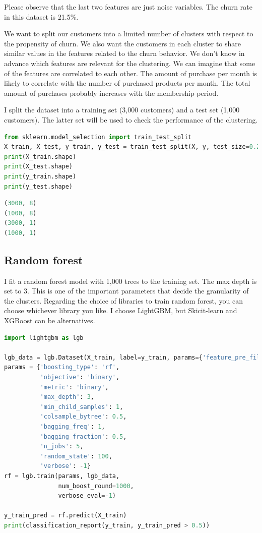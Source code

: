 \documentclass{article}
\begin{document}
Please observe that the last two features are just noise variables. The churn rate in this dataset is 21.5\%.

We want to split our customers into a limited number of clusters with respect to the propensity of churn. We also want the customers in each cluster to share similar values in the features related to the churn behavior. We don't know in advance which features are relevant for the clustering. We can imagine that some of the features are correlated to each other. The amount of purchase per month is likely to correlate with the number of purchased products per month. The total amount of purchases probably increases with the membership period.

I split the dataset into a training set (3,000 customers) and a test set (1,000 customers). The latter set will be used to check the performance of the clustering.

\begin{lstlisting}[language=Python]
from sklearn.model_selection import train_test_split
X_train, X_test, y_train, y_test = train_test_split(X, y, test_size=0.25, random_state=12)
print(X_train.shape)
print(X_test.shape)
print(y_train.shape)
print(y_test.shape)
\end{lstlisting}

\begin{lstlisting}[language=Python,numbers=none]
(3000, 8)
(1000, 8)
(3000, 1)
(1000, 1)
\end{lstlisting}

\subsection{Random forest}
I fit a random forest model with 1,000 trees to the training set. The max depth is set to 3. This is one of the important parameters that decide the granularity of the clusters. Regarding the choice of libraries to train random forest, you can choose whichever library you like. I choose LightGBM, but Skicit-learn and XGBoost can be alternatives.

\begin{lstlisting}[language=Python]
import lightgbm as lgb
    
lgb_data = lgb.Dataset(X_train, label=y_train, params={'feature_pre_filter': False})
params = {'boosting_type': 'rf',
          'objective': 'binary',
          'metric': 'binary',
          'max_depth': 3, 
          'min_child_samples': 1,
          'colsample_bytree': 0.5,
          'bagging_freq': 1,
          'bagging_fraction': 0.5,
          'n_jobs': 5,
          'random_state': 100,
          'verbose': -1}
rf = lgb.train(params, lgb_data,
               num_boost_round=1000,
               verbose_eval=-1)

y_train_pred = rf.predict(X_train)
print(classification_report(y_train, y_train_pred > 0.5))
\end{lstlisting}
\end{document}
